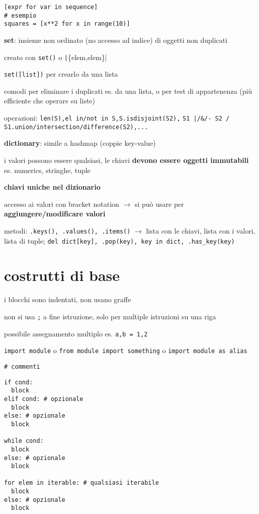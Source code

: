 \begin{verbatim}
[expr for var in sequence]
# esempio
squares = [x**2 for x in range(10)]
\end{verbatim}

\textbf{set}: insieme non ordinato (no accesso ad indice) di oggetti non duplicati

creato con \texttt{set()} o \texttt|\{elem,elem\}|

\texttt{set([list])} per crearlo da una lista

comodi per eliminare i duplicati es. da una lista, o per test di appartenenza (pi\`u efficiente che operare su liste)

operazioni: \texttt{len(S),el in/not in S,S.isdisjoint(S2),}
\newline\texttt{S1 |/&/- S2 / S1.union/intersection/difference(S2),...}

\textbf{dictionary}: simile a hashmap (coppie key-value)

i valori possono essere qualsiasi, le chiavi \textbf{devono essere oggetti immutabili} es. numerics, stringhe, tuple

\textbf{chiavi uniche nel dizionario}

accesso ai valori con bracket notation $\rightarrow$ si pu\`o usare per \textbf{aggiungere/modificare valori}

metodi: \texttt{.keys(), .values(), .items()} $\rightarrow$ lista con le chiavi, lista con i valori, lista di tuple; \texttt{del dict[key], .pop(key), key in dict, .has_key(key)}

\section{costrutti di base}

i blocchi sono indentati, non usano graffe

non si usa \texttt{;} a fine istruzione, solo per multiple istruzioni su una riga

possibile assegnamento multiplo es. \texttt{a,b = 1,2}

\texttt{import module} o \texttt{from module import something} o \texttt{import module as alias}

\texttt{# commenti}

\begin{verbatim}
if cond:
  block
elif cond: # opzionale
  block
else: # opzionale
  block
  
while cond:
  block
else: # opzionale
  block

for elem in iterable: # qualsiasi iterabile
  block
else: # opzionale
  block
\end{verbatim}

